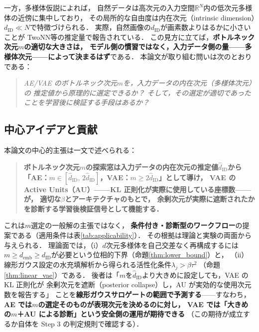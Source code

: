 \documentclass[11pt,a4paper]{jsarticle}
\newcommand{\dID}{d_{\mathrm{ID}}}
\newcommand{\hatdID}{\hat{d}_{\mathrm{ID}}}
\newcommand{\R}{\mathbb{R}}
\newcommand{\demb}{d_{\mathrm{emb}}}
\begin{document}
一方，多様体仮説\cite{fefferman2016manifold}によれば，
自然データは高次元の入力空間$\R^N$内の低次元多様体の近傍に集中しており，
その局所的な自由度は内在次元（intrinsic dimension）$\dID \ll N$で特徴づけられる．
実際，自然画像の$\dID$が画素数よりはるかに小さいことが
TwoNN\cite{facco2017twonn}等の推定量で報告されている\cite{pope2021intrinsic}．
この見方に立てば，\textbf{ボトルネック次元$m$の適切な大きさは，
モデル側の慣習ではなく，入力データ側の量——多様体次元——によって決まるはず}である．
本論文が取り組む問いは次のとおりである：
\begin{quote}
\textit{AE/VAE のボトルネック次元$m$を，入力データの内在次元（多様体次元）の
推定値から原理的に選定できるか？
そして，その選定が適切であったことを学習後に検証する手段はあるか？}
\end{quote}

\subsection{中心アイデアと貢献}\label{sec:intro_aim}

本論文の中心的主張は一文で述べられる：
\begin{quote}
\textbf{ボトルネック次元$m$の探索窓は入力データの内在次元の推定値$\hatdID$から
「AE：$m \in [\hatdID,\, 2\hatdID]$，VAE：$m \geq 2\hatdID$」として導け，
VAE の Active Units（AU）——KL 正則化が実際に使用している座標数——が，
適切な$\beta$とアーキテクチャのもとで，
余剰次元が実際に遮断されたかを診断する学習後検証信号として機能する．}
\end{quote}
これは$m$選定の一般解の主張ではなく，
\textbf{条件付き・診断型のワークフロー}の提案である（適用条件は表\ref{tab:applicability}）．
その根拠は理論と実験の両面から与えられる．
理論面では，（i）$d$次元多様体を自己交差なく再構成するには
$m \geq \demb \geq \dID$が必要という位相的下界（命題\ref{thm:lower_bound}）と，
（ii）線形ガウス設定の水充填解析から得られる活性化条件$\lambda_j > \beta\tau^2$
（命題\ref{thm:linear_vae}）である．
後者は「$m$を$\hatdID$より大きめに設定しても，VAE の KL 正則化が
余剰次元を遮断（posterior collapse）し，AU が実効的な使用次元数を報告する」
ことを\textbf{線形ガウスサロゲートの範囲で予測する}——すなわち，
\textbf{AE では$m$の選定そのものが表現次元を決めるのに対し，
VAE では「大きめの$m$＋AU による診断」という安全側の運用が期待できる}
（この期待が成立するか自体を Step 3 の判定規則で確認する）．
\end{document}
